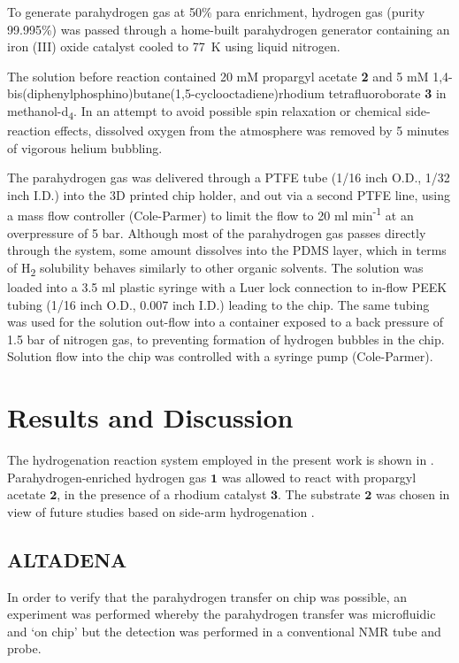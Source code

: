 To generate parahydrogen gas at 50\% para enrichment, hydrogen gas
(purity 99.995\%) was passed through a home-built parahydrogen generator
containing an iron (III) oxide catalyst cooled to 77~K using liquid
nitrogen.

The solution before reaction contained 20 mM propargyl acetate \textbf{2}
and 5 mM
1,4-bis(diphenyl\-phosphino)\-butane(1,5-cyclo\-octadiene)\-rhodium
tetra\-fluoro\-borate \textbf{3} in methanol-d\textsubscript{4}. In an attempt to
avoid possible spin relaxation or chemical side-reaction effects,
dissolved oxygen from the atmosphere was removed by 5 minutes of
vigorous helium bubbling.

The parahydrogen gas was delivered through a PTFE tube (1/16 inch O.D.,
1/32 inch I.D.) into the 3D printed chip holder, and out via a second
PTFE line, using a mass flow controller (Cole-Parmer) to limit the flow
to 20 ml min\textsuperscript{-1} at an overpressure of 5 bar. Although
most of the parahydrogen gas passes directly through the system, some
amount dissolves into the PDMS layer, which in terms of
H\textsubscript{2} solubility behaves similarly to other organic
solvents. The solution was loaded into a 3.5 ml plastic syringe with a
Luer lock connection to in-flow PEEK tubing (1/16 inch O.D., 0.007 inch
I.D.) leading to the chip. The same tubing was used for the solution
out-flow into a container exposed to a back pressure of 1.5 bar of
nitrogen gas, to preventing formation of hydrogen bubbles in the chip.
Solution flow into the chip was controlled with a syringe pump (Cole-Parmer).

\section{Results and Discussion}

The hydrogenation reaction system employed in the present work is shown in
.
Para\-hydrogen-en\-riched hydrogen gas $\mathbf{1}$ was
allowed to react with propargyl acetate $\mathbf{2}$, in the presence of
a rhodium catalyst $\mathbf{3}$. The substrate $\mathbf{2}$ was chosen in
view of future studies based on side-arm hydrogenation
\cite{Reineri:2015he,cavallari201813,cavallari2015effects}.

\subsection{ALTADENA}

In order to verify that the parahydrogen transfer on chip was possible, an
experiment was performed whereby the parahydrogen transfer was microfluidic
and ‘on chip’ but the detection was performed in a conventional NMR tube and probe.

